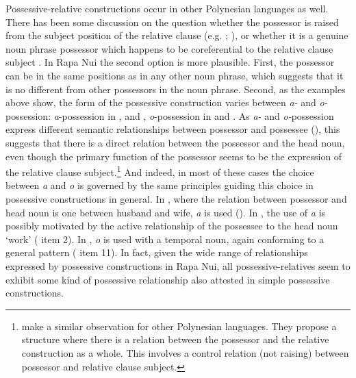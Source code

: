 Possessive-relative constructions occur in other Polynesian languages as well. There has been some discussion on the question whether the possessor is raised from the subject position of the relative clause (e.g. \citealt[367]{Harlow2000}; \citealt[185]{Harlow2007Maori}), or whether it is a genuine noun phrase possessor which happens to be coreferential to the relative clause subject \citep[116]{Clark1976}. In Rapa Nui the second option is more plausible. First, the possessor can be in the same positions as in any other noun phrase, which suggests that it is no different from other possessors in the noun phrase. Second, as the examples above show, the form of the possessive construction varies between \textit{a-} and \textit{o-}possession: \textit{a}{}-possession in ,  and , \textit{o}{}-possession in  and . As \textit{a-} and \textit{o-}possession express different semantic relationships between possessor and possessee (), this suggests that there is a direct relation between the possessor and the head noun, even though the primary function of the possessor seems to be the expression of the relative clause subject.\footnote{\label{fn:517}\citet{HerdMacdonald2011} make a similar observation for other Polynesian languages. They propose a structure where there is a relation between the possessor and the relative construction as a whole. This involves a control relation (not raising) between possessor and relative clause subject.} And indeed, in most of these cases the choice between \textit{{\ꞌ}a} and \textit{o} is governed by the same principles guiding this choice in possessive constructions in general. In , where the relation between possessor and head noun is one between husband and wife, \textit{{\ꞌ}a} is used (). In , the use of \textit{{\ꞌ}a} is possibly motivated by the active relationship of the possessee to the head noun ‘work’ ( item 2). In , \textit{o} is used with a temporal noun, again conforming to a general pattern ( item 11). In fact, given the wide range of relationships expressed by possessive constructions in Rapa Nui, all possessive-relatives seem to exhibit some kind of possessive relationship also attested in simple possessive constructions.

